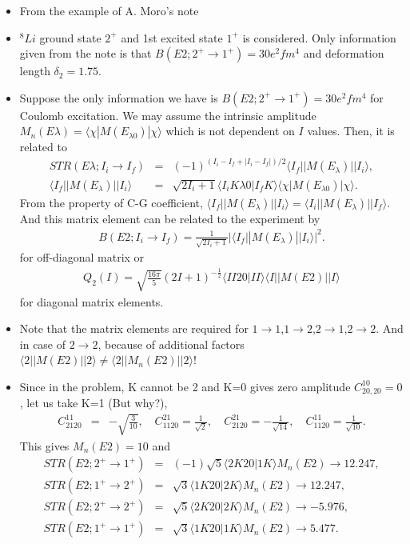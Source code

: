\documentclass[11pt]{book}
\def\la{\langle}
\def\ra{\rangle}
\newcommand{\bea}{\begin{eqnarray}}
\newcommand{\eea}{\end{eqnarray}}
\newcommand{\no}{\nonumber \\}
\begin{document}
\begin{itemize}
\item From the example of A. Moro's note
\item $^8Li$ ground state $2^+$ and 1st excited state $1^+$ is considered. 
      Only information given from the note is that 
      $B(E2;2^+\to 1^+)=30 e^2 fm^4$ and deformation length $\delta_2=1.75$. 
    
\item Suppose the only information we have is 
            $B(E2;2^+\to 1^+)=30 e^2 fm^4$ for Coulomb 
            excitation. 
       We may assume the intrinsic amplitude 
       $M_n(E\lambda)=\la \chi|M(E_{\lambda0})|\chi\ra$
       which is not dependent on $I$ values. Then, it is related to 
       \bea 
       STR(E\lambda;I_i\to I_f)
       &=&(-1)^{(I_i-I_f+|I_i-I_f|)/2} 
       \la I_f||M(E_\lambda)||I_i\ra,\no 
       \la I_f||M(E_\lambda)||I_i\ra 
       &=&\sqrt{2I_i+1}\la I_i K\lambda 0|I_f K\ra 
       \la \chi|M(E_{\lambda0})|\chi\ra. 
       \eea      
       From the property of C-G coefficient,
       $\la I_f||M(E_\lambda)||I_i\ra
       =\la I_i||M(E_\lambda)||I_f\ra$.     
       And this matrix element can be related to the experiment
       by 
       \bea 
       B(E2;I_i\to I_f)=\frac{1}{\sqrt{2I_i+1}}|\la I_f||M(E_\lambda)||I_i\ra|^2.
       \eea 
       for off-diagonal matrix or
       \bea 
       Q_2(I)=\sqrt{\frac{16\pi}{5}}(2I+1)^{-\frac{1}{2}}
           \la I I 20|II\ra \la I|| M(E2)||I\ra
       \eea 
       for diagonal matrix elements.

\item Note that the matrix elements are required for $1\to 1$,$1\to 2$,$2\to 1$,$2\to 2$.
     And in case of $2\to 2$, because of additional factors {\color{red} $\la 2||M(E2)||2\ra \neq \la 2||M_n(E2)||2\ra$!}

\item  Since in the problem, 
       K cannot be 2 and K=0 gives zero amplitude 
       $C_{20,20}^{10}=0$, let us take K=1 
       {\color{blue} (But why?)}, 
       \bea 
       C_{2120}^{11}&=&-\sqrt{\frac{3}{10}},\quad 
       C_{1120}^{21}=\frac{1}{\sqrt{2}}, \quad 
       C_{2120}^{21}=-\frac{1}{\sqrt{14}},\quad 
       C_{1120}^{11}=\frac{1}{\sqrt{10}}.
       \eea 
       This gives $M_n(E2)=10$ and
       \bea 
       STR(E2;2^+\to 1^+)
              &=&(-1)\sqrt{5}\la 2 K 20|1K\ra M_n(E2)\to 12.247,\no 
       STR(E2;1^+\to 2^+)
                     &=&\sqrt{3}\la 1 K 20|2K\ra M_n(E2)\to 12.247,\no        
       STR(E2;2^+\to 2^+)&=&\sqrt{5}\la 2 K 20|2K\ra M_n(E2)\to -5.976,\no
       STR(E2;1^+\to 1^+)&=&\sqrt{3}\la 1 K 20|1K\ra M_n(E2)
       \to 5.477.
       \eea 
       

\end{itemize}
\end{document}
